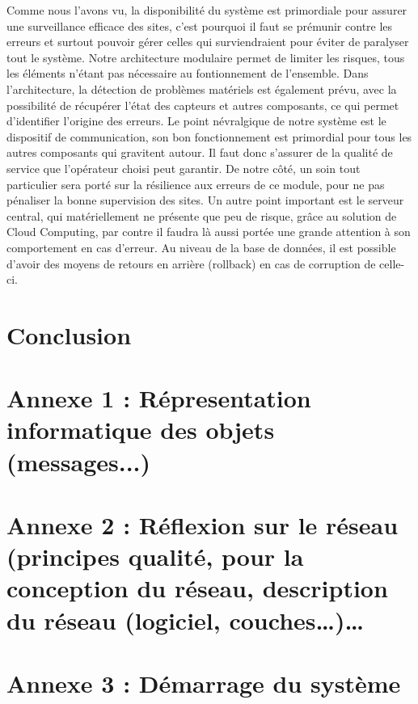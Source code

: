 Comme nous l'avons vu, la disponibilité du système est primordiale pour assurer une surveillance efficace des sites, c'est pourquoi il faut se prémunir contre les erreurs et surtout pouvoir gérer celles qui surviendraient pour éviter de paralyser tout le système. Notre architecture modulaire permet de limiter les risques, tous les éléments n'étant pas nécessaire au fontionnement de l'ensemble.
Dans l'architecture, la détection de problèmes matériels est également prévu, avec la possibilité de récupérer l'état des capteurs et autres composants, ce qui permet d'identifier l'origine des erreurs.
Le point névralgique de notre système est le dispositif de communication, son bon fonctionnement est primordial pour tous les autres composants qui gravitent autour. Il faut donc s'assurer de la qualité de service que l'opérateur choisi peut garantir. De notre côté, un soin tout particulier sera porté sur la résilience aux erreurs de ce module, pour ne pas pénaliser la bonne supervision des sites.
Un autre point important est le serveur central, qui matériellement ne présente que peu de risque, grâce au solution de Cloud Computing, par contre il faudra là aussi portée une grande attention à son comportement en cas d'erreur. Au niveau de la base de données, il est possible d'avoir des moyens de retours en arrière (rollback) en cas de corruption de celle-ci.

\section{Conclusion}

\newpage
\appendix
\appendixpage

\section{Annexe 1 : Répresentation informatique des objets (messages...)}

\section{Annexe 2 : Réflexion sur le réseau (principes qualité, pour la conception du réseau,
description du réseau (logiciel, couches…)…}



\section{Annexe 3 : Démarrage du système}


